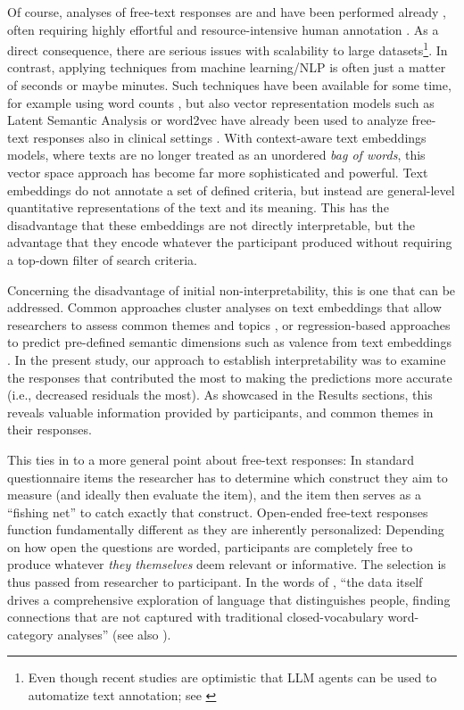 \documentclass[man,floatsintext]{apa7}
\newcommand{\change}[1]{#1}
\begin{document}
Of course, analyses of free-text responses are and have been performed already \parencite{mayring2014qualitative}, often requiring highly effortful and resource-intensive human annotation \cite{braun2006using,oconnor2020intercoder}. As a direct consequence, there are serious issues with scalability to large datasets\footnote{Even though recent studies are optimistic that LLM agents can be used to automatize text annotation; see \textcite{ziems2024can,gilardi2023chatgpt} }. In contrast, applying techniques from machine learning/NLP is often just a matter of seconds or maybe minutes. Such techniques have been available for some time, for example using word counts \parencite{tausczik2010psychological}, but also vector representation models such as Latent Semantic Analysis or word2vec have already been used to analyze free-text responses also in clinical settings \cite{barattieri2023automated,de2018clinical,kintsch2002potential,elvevaag2007quantifying}. With context-aware text embeddings models, where texts are no longer treated as an unordered \emph{bag of words}, this vector space approach has become far more sophisticated and powerful. Text embeddings do not annotate a set of defined criteria, but instead are general-level quantitative representations of the text and its meaning. This has the disadvantage that these embeddings are not directly interpretable, but the advantage that they encode whatever the participant produced without requiring a top-down filter of search criteria. 

Concerning the disadvantage of initial non-interpretability, this is one that can be addressed. Common approaches cluster analyses on text embeddings that allow researchers to assess common themes and topics \parencite{grootendorst2022bertopic,lalk2024measuring}, or regression-based approaches to predict pre-defined semantic dimensions such as valence from text embeddings \parencite{gatti2024valence}. In the present study, our approach to establish interpretability was to examine the responses that contributed the most to making the predictions more accurate (i.e., decreased residuals the most). As showcased in the Results sections, this reveals valuable information provided by participants, and common themes in their responses.

This ties in to a more general point about free-text responses: In standard questionnaire items  the researcher has to determine which construct they aim to measure (and ideally then evaluate the item), and the item then serves as a ``fishing net'' to catch exactly that construct.  Open-ended free-text responses function fundamentally different \change{as they are inherently personalized}: Depending on how open the questions are worded, participants are completely free to produce whatever \emph{they themselves} deem relevant or informative. The selection is thus passed from researcher to participant. In the words of \textcite{schwartz2013personality}, ``the data itself drives a comprehensive exploration of language that distinguishes people, finding connections that are not captured with traditional closed-vocabulary word-category analyses'' (see also \cite{boyd2021natural}).
\end{document}
